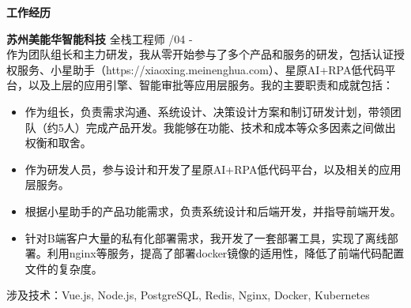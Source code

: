 \documentclass[a4paper]{article}
\newenvironment{changemargin}[2]{%
  \begin{list}{}{%
    \setlength{\topsep}{0pt}%
    \setlength{\leftmargin}{#1}%
    \setlength{\rightmargin}{#2}%
    \setlength{\listparindent}{\parindent}%
    \setlength{\itemindent}{\parindent}%
    \setlength{\parsep}{\parskip}%
  }%
  \item[]}{\end{list}
}
\newcommand{\lineover}{
	\begin{changemargin}{-0.05in}{-0.05in}
		\vspace*{-8pt}
		\hrulefill \\
		\vspace*{-2pt}
	\end{changemargin}
}
\newcommand{\header}[1]{
	\begin{changemargin}{-0.5in}{-0.5in}
	\fontsize{12}{14} \scshape{\textbf{#1}}\\
	\end{changemargin}
}
\newenvironment{body} {
	\vspace*{-16pt}
	\begin{changemargin}{-0.5in}{-0.5in}
  }	
	{\end{changemargin}
}
\begin{document}
\header{工作经历}
\begin{body}
	\vspace{14pt}
	\textbf{苏州美能华智能科技} \hfill 全栈工程师 {/04 - }\\
	\smallskip
	作为团队组长和主力研发，我从零开始参与了多个产品和服务的研发，包括认证授权服务、小星助手（https://xiaoxing.meinenghua.com）、星原AI+RPA低代码平台，以及上层的应用引擎、智能审批等应用层服务。我的主要职责和成就包括：
	\vspace*{-2pt}
	\begin{itemize} \itemsep -0pt  %
		\item 作为组长，负责需求沟通、系统设计、决策设计方案和制订研发计划，带领团队（约5人）完成产品开发。我能够在功能、技术和成本等众多因素之间做出权衡和取舍。\\
	\end{itemize}
	\vspace*{-8pt}
	\begin{itemize} \itemsep -0pt  %
		\item 作为研发人员，参与设计和开发了星原AI+RPA低代码平台，以及相关的应用层服务。\\
	\end{itemize}
	\vspace*{-10pt}
	\begin{itemize} \itemsep -0pt  %
		\item 根据小星助手的产品功能需求，负责系统设计和后端开发，并指导前端开发。\\
	\end{itemize}
	\vspace*{-10pt}
	\begin{itemize} \itemsep -0pt  %
		\item 针对B端客户大量的私有化部署需求，我开发了一套部署工具，实现了离线部署。利用nginx等服务，提高了部署docker镜像的适用性，降低了前端代码配置文件的复杂度。\\
	\end{itemize}	
	\vspace*{-4pt}
	涉及技术：{\fontarial Vue.js, Node.js, PostgreSQL, Redis, Nginx, Docker, Kubernetes}\\


\end{body}
\end{document}
